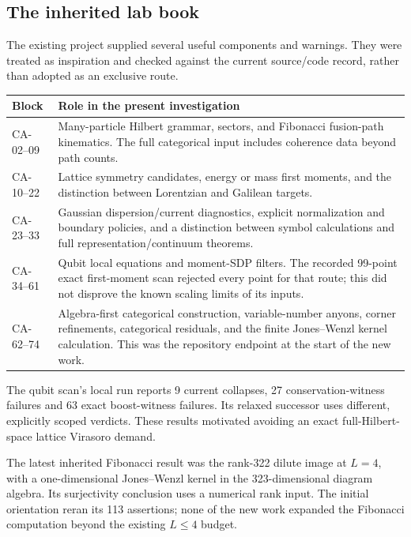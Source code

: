 
\subsection{The inherited lab book}

The existing project supplied several useful components and warnings.
They were treated as inspiration and checked against the current source/code
record, rather than adopted as an exclusive route.

\begin{longtable}{@{}p{}p{}@{}}
\toprule
Block & Role in the present investigation\\\midrule
CA-02--09 & Many-particle Hilbert grammar, sectors, and Fibonacci fusion-path
kinematics. The full categorical input includes coherence data beyond path counts.\\
CA-10--22 & Lattice symmetry candidates, energy or mass first moments, and
the distinction between Lorentzian and Galilean targets.\\
CA-23--33 & Gaussian dispersion/current diagnostics, explicit normalization
and boundary policies, and a distinction between symbol calculations and
full representation/continuum theorems.\\
CA-34--61 & Qubit local equations and moment-SDP filters. The recorded
99-point exact first-moment scan rejected every point for that route;
this did not disprove the known scaling limits of its inputs.\\
CA-62--74 & Algebra-first categorical construction, variable-number anyons,
corner refinements, categorical residuals, and the finite Jones--Wenzl kernel
calculation. This was the repository endpoint at the start of the new work.\\
\bottomrule
\end{longtable}

The qubit scan's local run reports 9 current collapses, 27 conservation-witness
failures and 63 exact boost-witness failures. Its relaxed successor uses
different, explicitly scoped verdicts. These results motivated avoiding an
exact full-Hilbert-space lattice Virasoro demand.

The latest inherited Fibonacci result was the rank-322 dilute image at
$L=4$, with a one-dimensional Jones--Wenzl kernel in the 323-dimensional
diagram algebra. Its surjectivity conclusion uses a numerical rank input.
The initial orientation reran its 113 assertions; none of the new work expanded
the Fibonacci computation beyond the existing $L\le4$ budget.

